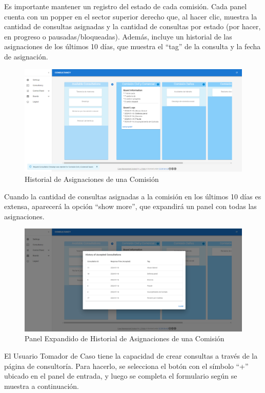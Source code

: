 Es importante mantener un registro del estado de cada comisión. Cada panel cuenta con un popper en el sector superior derecho que, al hacer clic, muestra la cantidad de consultas asignadas y la cantidad de consultas por estado (por hacer, en progreso o pausadas/bloqueadas). Además, incluye un historial de las asignaciones de los últimos 10 días, que muestra el ``tag'' de la consulta y la fecha de asignación.

\begin{figure}[H]
    \centering
    \includegraphics[width=1\linewidth]{fig/consultancy-real-page-logs-1.png}
    \caption{Historial de Asignaciones de una Comisión}
    \label{fig:consultancy-logs-1}
\end{figure}

Cuando la cantidad de consultas asignadas a la comisión en los últimos 10 días es extensa, aparecerá la opción ``show more'', que expandirá un panel con todas las asignaciones.

\begin{figure}[H]
    \centering
    \includegraphics[width=1\linewidth]{fig/consultancy-real-page-logs-2.png}
    \caption{Panel Expandido de Historial de Asignaciones de una Comisión}
    \label{fig:consultancy-logs-2}
\end{figure}

El Usuario Tomador de Caso tiene la capacidad de crear consultas a través de la página de consultoría. Para hacerlo, se selecciona el botón con el símbolo ``+'' ubicado en el panel de entrada, y luego se completa el formulario según se muestra a continuación.

